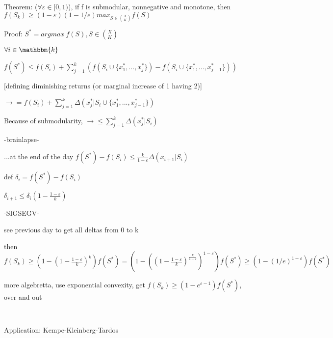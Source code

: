 \documentclass{report}
\begin{document}
	Theorem: ($\forall \varepsilon \in [0, 1)$), if f is submodular, nonnegative and monotone, then $f(S_k) \geq (1-\varepsilon)(1-1/e)max_{S \in \binom{X}{K}}f(S)$

	Proof: $S^* = argmax\ f(S), S \in \binom{X}{K}$
	
	$\forall i \in \mathbbm{k}$
	
	$f(S^*) \leq f(S_i) + \sum_{j=1}^{k}(f(S_i \cup\{x_1^*, ..., x_j^*\})-f(S_i \cup\{x_1^*, ..., x_{j-1}^*\}))$
	
	[defining diminishing returns (or marginal increase of {1} having {2})]
	
	$\to = f(S_i)+ \sum_{j=1}^{k}\Delta(x_j^* | S_i \cup \{x_1^*, ..., x_{j-1}^*\})$
	
	Because of submodularity, $\to \leq \sum_{j=1}^{k}\Delta(x_j^* | S_i)$
	
	-brainlapse-
	
	...at the end of the day $f(S^*) - f (S_i) \leq \frac{k}{1-\varepsilon}\Delta(x_{i+1}| S_i)$
	
	def $\delta_i = f(S^*) - f(S_i)$
	
	$\delta_{i+1} \leq \delta_i(1-\frac{1-\varepsilon}{k})$
	
	-SIGSEGV-
	
	see previous day to get all deltas from 0 to k
	
	then $f(S_k) \geq (1-(1-\frac{1-\varepsilon}{k})^k)f(S^*)=(1-((1-\frac{1-\varepsilon}{k})^{\frac{k}{1-\varepsilon}})^{1-\varepsilon})f(S^*) \geq (1-(1/e)^{1-\varepsilon})f(S^*)$
	
	more algebretta, use exponential convexity, get $f(S_k) \geq (1-e^{\varepsilon-1})f(S^*)$, over and out
	
	\
	
	Application: Kempe-Kleinberg-Tardos
	
	
\end{document}

